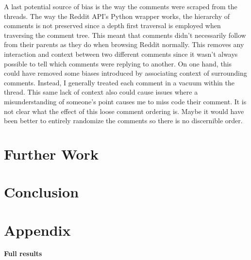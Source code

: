 \documentclass[11pt]{article}
\begin{document}
	A last potential source of bias is the way the comments were scraped from the threads. The way the Reddit API's Python wrapper works, the hierarchy of comments is not preserved since a depth first traversal is employed when traversing the comment tree. This meant that comments didn't necessarily follow from their parents as they do when browsing Reddit normally. This removes any interaction and context between two different comments since it wasn't always possible to tell which comments were replying to another. On one hand, this could have removed some biases introduced by associating context of surrounding comments. Instead, I generally treated each comment in a vacuum within the thread. This same lack of context also could cause issues where a misunderstanding of someone's point causes me to miss code their comment. It is not clear what the effect of this loose comment ordering is. Maybe it would have been better to entirely randomize the comments so there is no discernible order. 
	\section{Further Work}\label{sec:further}
	\section{Conclusion}\label{sec:conclusion}
	\section{Appendix}\label{sec:appendix}
	\textbf{Full results}
	
	
\end{document}
